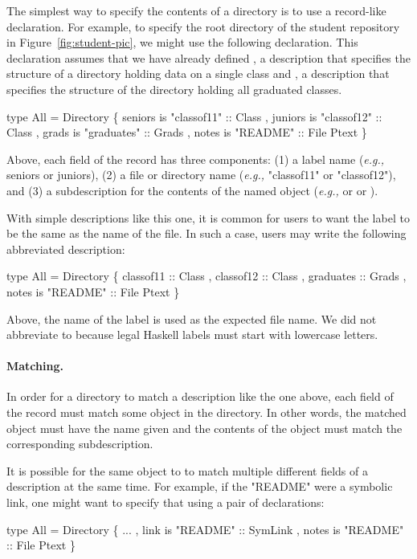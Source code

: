 \documentclass[natbib]{sigplanconf}
\begin{document}
The simplest way to specify the contents of a directory is to use
a record-like declaration.  For example, to specify the root directory
of the student repository in Figure~\ref{fig:student-pic}, we might use
the following declaration.  This declaration assumes that we have already
defined , a description that specifies
the structure of a directory holding data on a single class
and , a description that specifies the structure of the directory holding
all graduated classes.   
\begin{code}
type All = Directory
  \{ seniors is "classof11" :: Class
  , juniors is "classof12" :: Class 
  , grads is "graduates" :: Grads
  , notes is "README" :: File Ptext
  \}
\end{code}
Above, each field of the record has three components:  (1) a label
name ({\it e.g.,} seniors or juniors), (2) a file or directory name
({\it e.g.,} "classof11" or "classof12"), and (3) a \forest{} subdescription
for the contents of the named object ({\it e.g.,}  or 
or ).

With simple descriptions like this one, it is common for users to want
the label to be the same as the name of the file.  In such a case, users
may write the following abbreviated description:
\begin{code}
type All = Directory
  \{ classof11 :: Class
  , classof12 :: Class 
  , graduates :: Grads
  , notes is "README" :: File Ptext
  \}
\end{code}
Above, the name of the label is used as the expected file name.  We did not
abbreviate  to  because legal Haskell labels must start
with lowercase letters.

\paragraph*{Matching.}
In order for a directory to match a description like the one above, 
each field of the record must match
some object in the directory.  In other words, the matched object must have the
name given and the contents of the object must match the corresponding subdescription.

It is possible for the same object to to match multiple different fields of a description at
the same time.  For example, if the "README" were a symbolic link, one might want to
specify that using a pair of declarations:
\begin{code}
type All = Directory
  \{ ...
  , link is "README" :: SymLink
  , notes is "README" :: File Ptext
  \}
\end{code}
\end{document}
